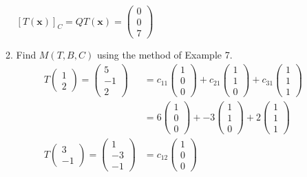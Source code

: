 \documentclass[letterpaper]{article}
\begin{document}
\begin{enumerate}
\begin{enumerate}
  $\displaystyle[T(\mathbf{x})]_C=QT(\mathbf{x})=\left(\begin{array}{r}0\\0\\7\end{array}\right)$

  \item
  Find $M(T,B,C)$ using the method of Example 7.
  \begin{align*}
    T\left(\begin{array}{r}1\\2\end{array}\right)=\left(\begin{array}{r}5\\-1\\2\end{array}\right)
    &=c_{11}\left(\begin{array}{r}1\\0\\0\end{array}\right)
    +c_{21}\left(\begin{array}{r}1\\1\\0\end{array}\right)
    +c_{31}\left(\begin{array}{r}1\\1\\1\end{array}\right)\\
    &=6\left(\begin{array}{r}1\\0\\0\end{array}\right)
    +-3\left(\begin{array}{r}1\\1\\0\end{array}\right)
    +2\left(\begin{array}{r}1\\1\\1\end{array}\right)\\
    T\left(\begin{array}{r}3\\-1\end{array}\right)=\left(\begin{array}{r}1\\-3\\-1\end{array}\right)
    &=c_{12}\left(\begin{array}{r}1\\0\\0\end{array}\right)

\end{align*}
\end{enumerate}
\end{enumerate}
\end{document}
